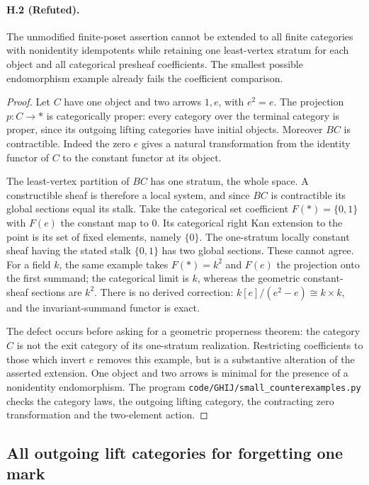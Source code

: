 \paragraph{H.2 (Refuted).}
The unmodified finite-poset assertion cannot be extended to all
finite categories with nonidentity idempotents while retaining one
least-vertex stratum for each object and all categorical presheaf
coefficients. The smallest possible endomorphism example already
fails the coefficient comparison.
\begin{proof}
Let $C$ have one object and two arrows $1,e$, with $e^2=e$.
The projection $p:C\to *$ is categorically proper: every category
over the terminal category is proper, since its outgoing lifting
categories have initial objects. Moreover $BC$ is contractible.
Indeed the zero $e$ gives a natural transformation from the
identity functor of $C$ to the constant functor at its object.

The least-vertex partition of $BC$ has one stratum, the whole
space. A constructible sheaf is therefore a local system, and
since $BC$ is contractible its global sections equal its stalk.
Take the categorical set coefficient $F(*)=\{0,1\}$ with
$F(e)$ the constant map to $0$. Its categorical right Kan
extension to the point is its set of fixed elements, namely
$\{0\}$. The one-stratum locally constant sheaf having the stated
stalk $\{0,1\}$ has two global sections. These cannot agree.
For a field $k$, the same example takes $F(*)=k^2$ and $F(e)$
the projection onto the first summand; the categorical limit is
$k$, whereas the geometric constant-sheaf sections are $k^2$.
There is no derived correction: $k[e]/(e^2-e)\cong k\times k$,
and the invariant-summand functor is exact.

The defect occurs before asking for a geometric properness
theorem: the category $C$ is not the exit category of its
one-stratum realization. Restricting coefficients to those which
invert $e$ removes this example, but is a substantive alteration
of the asserted extension. One object and two arrows is minimal
for the presence of a nonidentity endomorphism.
The program \texttt{code/GHIJ/small\_counterexamples.py}
checks the category laws, the outgoing lifting category, the
contracting zero transformation and the two-element action.
\end{proof}

\subsection{All outgoing lift categories for forgetting one mark}

